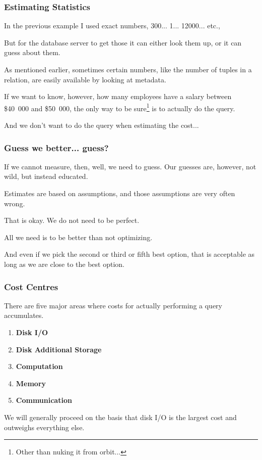 \begin{frame}
\frametitle{Estimating Statistics}

In the previous example I used exact numbers, 300... 1... 12000... etc.,

But for the database server to get those it can either look them up, or it can guess about them. 

As mentioned earlier, sometimes certain numbers, like the number of tuples in a relation, are easily available by looking at metadata. 

If we want to know, however, how many employees have a salary between \$40~000 and \$50~000, the only way to be sure\footnote{Other than nuking it from orbit...} is to actually do the query.

And we don't want to do the query when estimating the cost...

\end{frame}


\begin{frame}
\frametitle{Guess we better... guess?}

If we cannot measure, then, well, we need to guess. Our guesses are, however, not wild, but instead educated. 

Estimates are based on assumptions, and those assumptions are very often wrong. 

That is okay. We do not need to be perfect. 

All we need is to be better than not optimizing.

And even if we pick the second or third or fifth best option, that is acceptable as long as we are close to the best option.


\end{frame}

\begin{frame}
\frametitle{Cost Centres}

There are five major areas where costs for actually performing a query accumulates. 

\begin{enumerate}
	\item \textbf{Disk I/O}
	\item \textbf{Disk Additional Storage}
	\item \textbf{Computation}
	\item \textbf{Memory}
	\item \textbf{Communication}
\end{enumerate}

We will generally proceed on the basis that disk I/O is the largest cost and outweighs everything else.

\end{frame}


